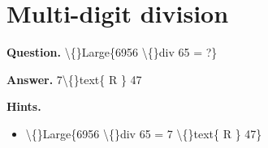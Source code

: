 \documentclass{article}
\begin{document}
\section*{Multi-digit division}
\textbf{Question.} \textbackslash\{\}Large\{6956 \textbackslash\{\}div  65 = ?\}

\textbf{Answer.} 7\textbackslash\{\}text\{ R \}
                        47

\textbf{Hints.}
\begin{itemize}
  \item \textbackslash\{\}Large\{6956 \textbackslash\{\}div 65 = 7 \textbackslash\{\}text\{ R \} 47\}
\end{itemize}
\end{document}
